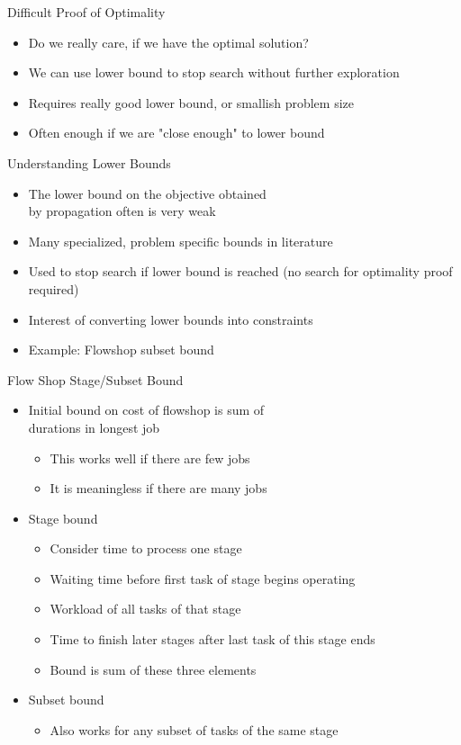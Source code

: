 \documentclass[dvipsnames,aspectratio=169]{beamer}
\begin{document}
\begin{frame}{Difficult Proof of Optimality}
\begin{itemize}
    \item Do we really care, if we have the optimal solution?
    \item We can use lower bound to stop search without further exploration
    \item Requires really good lower bound, or smallish problem size
    \item Often enough if we are "close enough" to lower bound
\end{itemize}
    
\end{frame}

\begin{frame}{Understanding Lower Bounds}
\begin{itemize}
    \item The lower bound on the objective obtained \\by propagation often is very weak
    \item Many specialized, problem specific bounds in literature
    \item Used to stop search if lower bound is reached (no search for optimality proof required) 
    \item Interest of converting lower bounds into constraints
    \item Example: Flowshop subset bound
\end{itemize}
\end{frame}

\begin{frame}{Flow Shop Stage/Subset Bound}
\begin{itemize}
    \item Initial bound on cost of flowshop is sum of \\durations in longest job
    \begin{itemize}
    \item This works well if there are few jobs
    \item It is meaningless if there are many jobs
    \end{itemize}
    \item Stage bound
    \begin{itemize}
    \item Consider time to process one stage
    \item Waiting time before first task of stage begins operating
    \item Workload of all tasks of that stage
    \item Time to finish later stages after last task of this stage ends
    \item Bound is sum of these three elements 
    \end{itemize}
    \item Subset bound
    \begin{itemize}
        \item Also works for any subset of tasks of the same stage
    \end{itemize}
\end{itemize}    
\end{frame}
\end{document}

